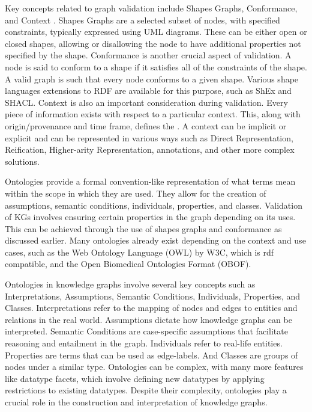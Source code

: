 \documentclass[11pt]{article} %
\begin{document}
Key concepts related to graph validation include Shapes Graphs, Conformance, and Context \cite{KG21}. Shapes Graphs are a selected subset of nodes, with specified constraints, typically expressed using UML diagrams. These can be either open or closed shapes, allowing or disallowing the node to have additional properties not specified by the shape. Conformance is another crucial aspect of validation. A node is said to conform to a shape if it satisfies all of the constraints of the shape. A valid graph is such that every node conforms to a given shape. Various shape languages extensions to RDF are available for this purpose, such as ShEx and SHACL. Context is also an important consideration during validation. Every piece of information exists with respect to a particular context. This, along with origin/provenance and time frame, defines the . A context can be implicit or explicit and can be represented in various ways such as Direct Representation, Reification, Higher-arity Representation, annotations, and other more complex solutions.

Ontologies provide a formal convention-like representation of what terms mean within the scope in which they are used. They allow for the creation of assumptions, semantic conditions, individuals, properties, and classes. Validation of KGs involves ensuring certain properties in the graph depending on its uses. This can be achieved through the use of shapes graphs and conformance as discussed earlier. Many ontologies already exist depending on the context and use cases, such as the Web Ontology Language (OWL) by W3C, which is \acrshort{rdf} compatible, and the Open Biomedical Ontologies Format (OBOF).

Ontologies in knowledge graphs involve several key concepts such as Interpretations, Assumptions, Semantic Conditions, Individuals, Properties, and Classes. Interpretations refer to the mapping of nodes and edges to entities and relations in the real world. Assumptions dictate how knowledge graphs can be interpreted. Semantic Conditions are case-specific assumptions that facilitate reasoning and entailment in the graph. Individuals refer to real-life entities. Properties are terms that can be used as edge-labels. And Classes are groups of nodes under a similar type. Ontologies can be complex, with many more features like datatype facets, which involve defining new datatypes by applying restrictions to existing datatypes. Despite their complexity, ontologies play a crucial role in the construction and interpretation of knowledge graphs.
\end{document}
